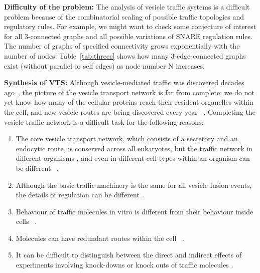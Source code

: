 \textbf{Difficulty of the problem:}
The analysis of vesicle traffic systems is a difficult problem
because of the combinatorial scaling of possible traffic topologies and regulatory rules. 
%
For example, we might want to check some conjecture of interest for all 3-connected graphs and
all possible variations of SNARE regulation rules. 
%
The number of graphs of specified connectivity grows exponentially with the number of nodes: Table~\ref{tab:threec} shows how many 3-edge-connected graphs~\cite{a052448-oeis} exist (without parallel or self edges) as node number N increases.

\textbf{Synthesis of VTS:}
Although vesicle-mediated traffic was discovered decades ago~\cite{wells2005discovery}, the picture of the vesicle transport network is far from complete; we do not yet know how many of the cellular proteins reach their resident organelles within the cell, and new vesicle routes are being discovered every year ~\cite{nickel2018unconventional,weill2018toolbox}. 
%
Completing the vesicle traffic network is a difficult task for the following reasons: 
\begin{enumerate}
	\item The core vesicle transport network, which consists of a secretory and an endocytic route, is conserved across all eukaryotes, but the traffic network in different organisms \cite{richardson2015evolutionary,nishimoto2009differential,barlow2017seeing}, and even in different cell types within an organism can be different ~\cite{stoops2014trafficking,zhou2015arp2}.
	
	\item Although the basic traffic machinery is the same for all vesicle fusion events, the details of regulation can be different~\cite{davletov2007regulation,di2010calcium}.
	
	\item Behaviour of traffic molecules in vitro is different from their behaviour inside cells ~\cite{furukawa2014multiple}.
	
	\item Molecules can have redundant routes within the cell ~\cite{shimizu2014compensatory,nakatsukasa2014nutrient}.
	
	\item It can be difficult to distinguish between the direct and indirect effects of experiments involving knock-downs or knock outs of traffic molecules \cite{hirst2004epsinr,mishev2013small}.
\end{enumerate}

